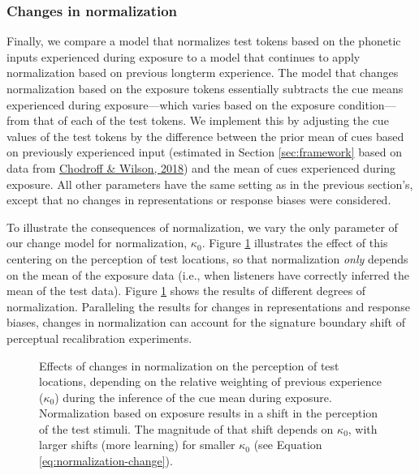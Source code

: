 \documentclass[
  11pt,
  english,
  man,floatsintext]{apa6}
\begin{document}
\hypertarget{changes-in-normalization}{%
\subsubsection{Changes in normalization}\label{changes-in-normalization}}

Finally, we compare a model that normalizes test tokens based on the phonetic inputs experienced during exposure to a model that continues to apply normalization based on previous longterm experience. The model that changes normalization based on the exposure tokens essentially subtracts the cue means experienced during exposure---which varies based on the exposure condition---from that of each of the test tokens. We implement this by adjusting the cue values of the test tokens by the difference between the prior mean of cues based on previously experienced input (estimated in Section \ref{sec:framework} based on data from \protect\hyperlink{ref-chodroff-wilson2018}{Chodroff \& Wilson, 2018}) and the mean of cues experienced during exposure. All other parameters have the same setting as in the previous section's, except that no changes in representations or response biases were considered.

To illustrate the consequences of normalization, we vary the only parameter of our change model for normalization, \(\kappa_0\). Figure \ref{fig:PR-test-normalization} illustrates the effect of this centering on the perception of test locations, so that normalization \emph{only} depends on the mean of the exposure data (i.e., when listeners have correctly inferred the mean of the test data). Figure \ref{fig:PR-test-normalization} shows the results of different degrees of normalization. Paralleling the results for changes in representations and response biases, changes in normalization can account for the signature boundary shift of perceptual recalibration experiments.



\begin{figure}

{\centering {}

}

\caption[Effects of changes in normalization on the perception of test locations, depending on the relative weighting of previous experience (\(\kappa_0\)) during the inference of the cue mean during exposure. Normalization based on exposure results in a shift in the perception of the test stimuli. The magnitude of that shift depends on \(\kappa_0\), with larger shifts (more learning) for smaller \(\kappa_0\) (see Equation \eqref{eq:normalization-change}).]{Effects of changes in normalization on the perception of test locations, depending on the relative weighting of previous experience (\(\kappa_0\)) during the inference of the cue mean during exposure. Normalization based on exposure results in a shift in the perception of the test stimuli. The magnitude of that shift depends on \(\kappa_0\), with larger shifts (more learning) for smaller \(\kappa_0\) (see Equation \eqref{eq:normalization-change}).}\label{fig:PR-test-normalization}
\end{figure}
\end{document}
